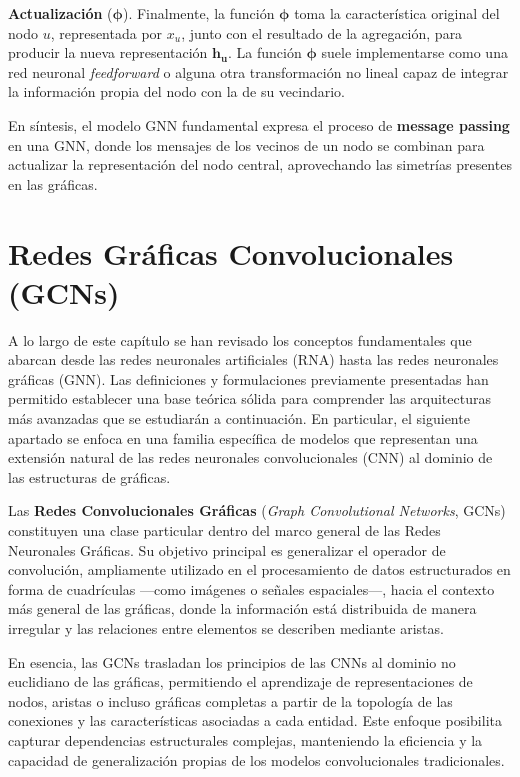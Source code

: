 \textbf{Actualización} ($\boldsymbol{\phi}$).
Finalmente, la función $\boldsymbol{\phi}$ toma la característica original del nodo $u$, representada por $x_u$, junto con el resultado de la agregación, para producir la nueva representación $\boldsymbol{h_u}$.
La función $\boldsymbol{\phi}$ suele implementarse como una red neuronal \emph{feedforward} o alguna otra transformación no lineal capaz de integrar la información propia del nodo con la de su vecindario.

En síntesis, el modelo GNN fundamental expresa el proceso de \textbf{message passing} en una GNN, donde los mensajes de los vecinos de un nodo se combinan para actualizar la representación del nodo central, aprovechando las simetrías presentes en las gráficas.

\section{Redes Gráficas Convolucionales (GCNs)}
A lo largo de este capítulo se han revisado los conceptos fundamentales que abarcan desde las redes neuronales artificiales (RNA) hasta las redes neuronales gráficas (GNN).
Las definiciones y formulaciones previamente presentadas han permitido establecer una base teórica sólida para comprender las arquitecturas más avanzadas que se estudiarán a continuación.
En particular, el siguiente apartado se enfoca en una familia específica de modelos que representan una extensión natural de las redes neuronales convolucionales (CNN) al dominio de las estructuras de gráficas.

Las \textbf{Redes Convolucionales Gráficas} (\emph{Graph Convolutional Networks}, GCNs) constituyen una clase particular dentro del marco general de las Redes Neuronales Gráficas. Su objetivo principal es generalizar el operador de convolución, ampliamente utilizado en el procesamiento de datos estructurados en forma de cuadrículas —como imágenes o señales espaciales—, hacia el contexto más general de las gráficas, donde la información está distribuida de manera irregular y las relaciones entre elementos se describen mediante aristas.

En esencia, las GCNs trasladan los principios de las CNNs al dominio no euclidiano de las gráficas, permitiendo el aprendizaje de representaciones de nodos, aristas o incluso gráficas completas a partir de la topología de las conexiones y las características asociadas a cada entidad.
Este enfoque posibilita capturar dependencias estructurales complejas, manteniendo la eficiencia y la capacidad de generalización propias de los modelos convolucionales tradicionales.

